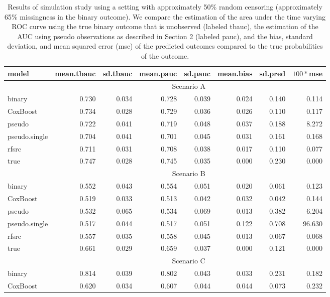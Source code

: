 \documentclass{statsoc}
\begin{document}
\begin{footnotesize}
\begin{table}
\caption{\label{sim2}Results of simulation study using a setting with approximately 50\% random censoring (approximately 65\% missingness in the binary outcome). We compare the estimation of the area under the time varying ROC curve using the true binary outcome that is unobserved (labeled tbauc), the estimation of the AUC using pseudo observations as described in Section 2 (labeled pauc), and the bias, standard deviation, and mean squared error (mse) of the predicted outcomes compared to the true probabilities of the outcome. }
\centering
\begin{tabular}{lrrrrrrr}
\hline
model & mean.tbauc & sd.tbauc & mean.pauc & sd.pauc & mean.bias & sd.pred & $100 * $mse\\
\hline
& \multicolumn{7}{c}{Scenario A} \\
\hline
binary & 0.730 & 0.034 & 0.728 & 0.039 & 0.024 & 0.140 & 0.114\\
CoxBoost & 0.734 & 0.028 & 0.729 & 0.036 & 0.026 & 0.110 & 0.117\\
pseudo & 0.722 & 0.041 & 0.719 & 0.048 & 0.037 & 0.188 & 8.272\\
pseudo.single & 0.704 & 0.041 & 0.701 & 0.045 & 0.031 & 0.161 & 0.168\\
rfsrc & 0.711 & 0.031 & 0.708 & 0.038 & 0.017 & 0.110 & 0.077\\
true & 0.747 & 0.028 & 0.745 & 0.035 & 0.000 & 0.230 & 0.000\\
\hline
& \multicolumn{7}{c}{Scenario B} \\
\hline
binary & 0.552 & 0.043 & 0.554 & 0.051 & 0.020 & 0.061 & 0.123\\
CoxBoost & 0.519 & 0.033 & 0.513 & 0.042 & 0.032 & 0.042 & 0.144\\
pseudo & 0.532 & 0.065 & 0.534 & 0.069 & 0.013 & 0.382 & 6.204\\
pseudo.single & 0.517 & 0.044 & 0.517 & 0.051 & 0.122 & 0.708 & 96.630\\
rfsrc & 0.557 & 0.035 & 0.558 & 0.045 & 0.013 & 0.067 & 0.068\\
true & 0.661 & 0.029 & 0.659 & 0.037 & 0.000 & 0.121 & 0.000\\
\hline
& \multicolumn{7}{c}{Scenario C} \\
\hline
binary & 0.814 & 0.039 & 0.802 & 0.043 & 0.033 & 0.231 & 0.182\\
CoxBoost & 0.620 & 0.034 & 0.607 & 0.044 & 0.044 & 0.073 & 0.232\\

\end{tabular}
\end{table}
\end{footnotesize}
\end{document}
